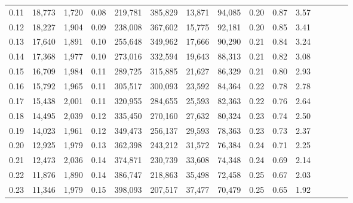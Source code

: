 \begin{tabular}{rrrcrrrrrrrrrrr}
0.11 &  18,773 &  1,720 &                                       0.08 &  219,781 &  385,829 &   13,871 &   94,085 &  0.20 &  0.87 &                         3.57 \\
0.12 &  18,227 &  1,904 &                                       0.09 &  238,008 &  367,602 &   15,775 &   92,181 &  0.20 &  0.85 &                         3.41 \\
0.13 &  17,640 &  1,891 &                                       0.10 &  255,648 &  349,962 &   17,666 &   90,290 &  0.21 &  0.84 &                         3.24 \\
0.14 &  17,368 &  1,977 &                                       0.10 &  273,016 &  332,594 &   19,643 &   88,313 &  0.21 &  0.82 &                         3.08 \\
0.15 &  16,709 &  1,984 &                                       0.11 &  289,725 &  315,885 &   21,627 &   86,329 &  0.21 &  0.80 &                         2.93 \\
0.16 &  15,792 &  1,965 &                                       0.11 &  305,517 &  300,093 &   23,592 &   84,364 &  0.22 &  0.78 &                         2.78 \\
0.17 &  15,438 &  2,001 &                                       0.11 &  320,955 &  284,655 &   25,593 &   82,363 &  0.22 &  0.76 &                         2.64 \\
0.18 &  14,495 &  2,039 &                                       0.12 &  335,450 &  270,160 &   27,632 &   80,324 &  0.23 &  0.74 &                         2.50 \\
0.19 &  14,023 &  1,961 &                                       0.12 &  349,473 &  256,137 &   29,593 &   78,363 &  0.23 &  0.73 &                         2.37 \\
0.20 &  12,925 &  1,979 &                                       0.13 &  362,398 &  243,212 &   31,572 &   76,384 &  0.24 &  0.71 &                         2.25 \\
0.21 &  12,473 &  2,036 &                                       0.14 &  374,871 &  230,739 &   33,608 &   74,348 &  0.24 &  0.69 &                         2.14 \\
0.22 &  11,876 &  1,890 &                                       0.14 &  386,747 &  218,863 &   35,498 &   72,458 &  0.25 &  0.67 &                         2.03 \\
0.23 &  11,346 &  1,979 &                                       0.15 &  398,093 &  207,517 &   37,477 &   70,479 &  0.25 &  0.65 &                         1.92 \\

\end{tabular}

